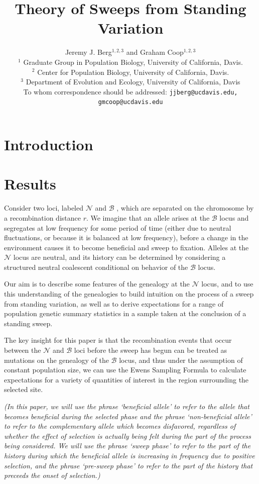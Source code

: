 \documentclass[a4paper,10pt]{article}
\title{Theory of Sweeps from Standing Variation}
\author{
Jeremy J. Berg$^{1,2,3}$ and Graham Coop$^{1,2,3}$ \\
$^1$ Graduate Group in Population Biology, University of California, Davis. \\
$^2$ Center for Population Biology, University of California, Davis.\\
$^3$ Department of Evolution and Ecology, University of California, Davis\\
\small To whom correspondence should be addressed: \texttt{jjberg@ucdavis.edu, gmcoop@ucdavis.edu}\\
}
\date{}
\newcommand{\fancyN}{$\mathcal N$ }
\newcommand{\fancyB}{$\mathcal B$ }
\newcommand{\jb}[1]{{\it\color{blue} (#1)} }
\begin{document}
\maketitle

\begin{abstract}
\end{abstract}

\section{Introduction}



\section{Results}
Consider two loci, labeled \fancyN and \fancyB, which are separated on the chromosome by a recombination distance $r$. We imagine that an allele arises at the \fancyB locus and segregates at low frequency for some period of time (either due to neutral fluctuations, or because it is balanced at low frequency), before a change in the environment causes it to become beneficial and sweep to fixation. Alleles at the \fancyN locus are neutral, and its history can be determined by considering a structured neutral coalescent conditional on behavior of the \fancyB locus.

Our aim is to describe some features of the genealogy at the \fancyN locus, and to use this understanding of the genealogies to build intuition on the process of a sweep from standing variation, as well as to derive expectations for a range of population genetic summary statistics in a sample taken at the conclusion of a standing sweep.

The key insight for this paper is that the recombination events that occur between the \fancyN and \fancyB loci before the sweep has begun can be treated as mutations on the genealogy of the \fancyB locus, and thus under the assumption of constant population size, we can use the Ewens Sampling Formula to calculate expectations for a variety of quantities of interest in the region surrounding the selected site.

\jb{In this paper, we will use the phrase `beneficial allele' to refer to the allele that becomes beneficial during the selected phase and the phrase `non-beneficial allele' to refer to the complementary allele which becomes disfavored, regardless of whether the effect of selection is actually being felt during the part of the process being considered. We will use the phrase `sweep phase' to refer to the part of the history during which the beneficial allele is increasing in frequency due to positive selection, and the phrase `pre-sweep phase' to refer to the part of the history that preceeds the onset of selection.}
\end{document}

